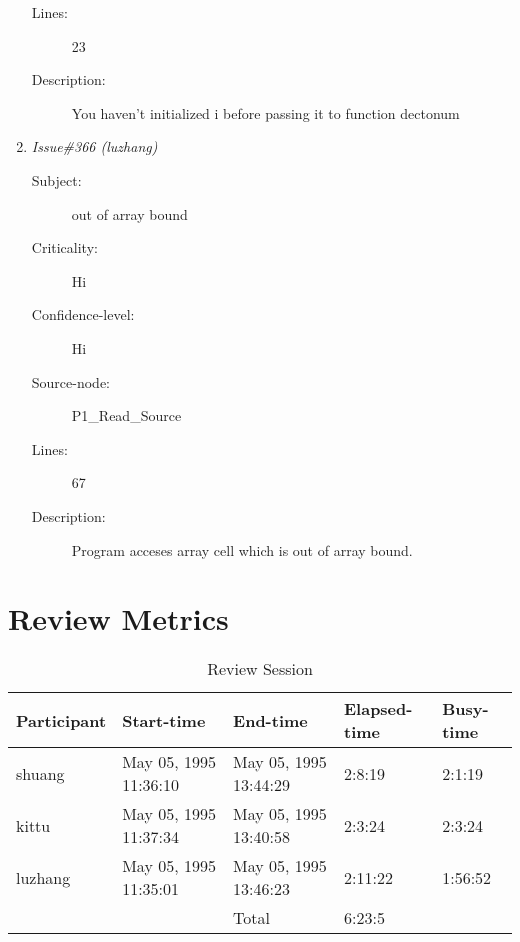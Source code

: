 \begin{enumerate}
\begin{description}
\item [Lines:] 23

\item [Description:] You haven't initialized i before passing it to
 function dectonum
\end{description}
\item {\it Issue\#366 (luzhang)}
\begin{description}
\item [Subject:] out of array bound
\item [Criticality:] Hi
\item [Confidence-level:] Hi
\item [Source-node:] P1\_Read\_Source

\item [Lines:] 67

\item [Description:] Program acceses array cell which is out of 
array bound.
\end{description}
\end{enumerate}
\section{Review Metrics}
\begin{table}[hb]
\begin{center}
\begin{tabular}{|l|l|l|l|l|}
\hline
Participant & Start-time & End-time & Elapsed-time & Busy-time \\
\hline
shuang & May 05, 1995 11:36:10 & May 05, 1995 13:44:29 & 2:8:19 & 2:1:19 \\
kittu & May 05, 1995 11:37:34 & May 05, 1995 13:40:58 & 2:3:24 & 2:3:24 \\
luzhang & May 05, 1995 11:35:01 & May 05, 1995 13:46:23 & 2:11:22 & 1:56:52 \\
\hline
 & & Total & 6:23:5 & \\
\hline
\end{tabular}
\end{center}
\caption{Review Session}
\end{table}


